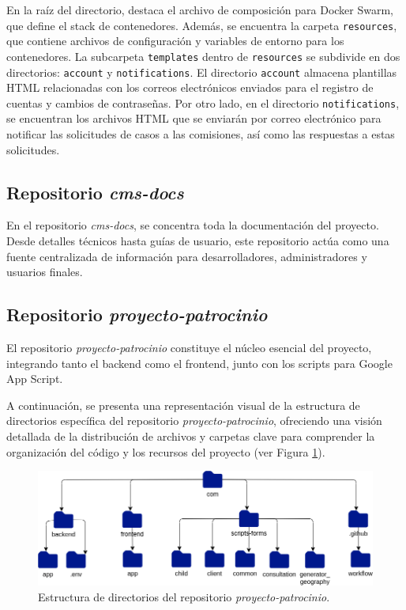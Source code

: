 En la raíz del directorio, destaca el archivo de composición para Docker Swarm, que define el stack de contenedores. Además, se encuentra la carpeta \texttt{resources}, que contiene archivos de configuración y variables de entorno para los contenedores. La subcarpeta \texttt{templates} dentro de \texttt{resources} se subdivide en dos directorios: \texttt{account} y \texttt{notifications}. El directorio \texttt{account} almacena plantillas HTML relacionadas con los correos electrónicos enviados para el registro de cuentas y cambios de contraseñas. Por otro lado, en el directorio \texttt{notifications}, se encuentran los archivos HTML que se enviarán por correo electrónico para notificar las solicitudes de casos a las comisiones, así como las respuestas a estas solicitudes. 


\subsection{Repositorio \textit{cms-docs}}

En el repositorio \textit{cms-docs}, se concentra toda la documentación del proyecto. Desde detalles técnicos hasta guías de usuario, este repositorio actúa como una fuente centralizada de información para desarrolladores, administradores y usuarios finales.

\subsection{Repositorio \textit{proyecto-patrocinio}}

El repositorio \textit{proyecto-patrocinio} constituye el núcleo esencial del proyecto, integrando tanto el backend como el frontend, junto con los scripts para Google App Script.

A continuación, se presenta una representación visual de la estructura de directorios específica del repositorio \textit{proyecto-patrocinio}, ofreciendo una visión detallada de la distribución de archivos y carpetas clave para comprender la organización del código y los recursos del proyecto (ver Figura \ref{fig:unit-directory}).

\begin{figure}[h]
    \centering
    \includegraphics[width=1\linewidth]{fig/directory.png}
    \caption{Estructura de directorios del repositorio \textit{proyecto-patrocinio}.}
    \label{fig:unit-directory}
\end{figure}

